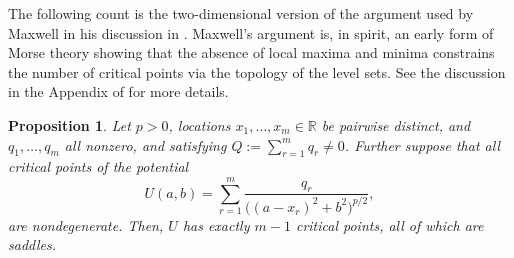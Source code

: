 \documentclass[leqno,11pt]{amsart}
\numberwithin{equation}{section}
\newtheorem{proposition}{Proposition}
\theoremstyle{definition}
\begin{document}
	The following count is the two-dimensional version of the argument used by Maxwell in his discussion in \cite[Chapter VI]{Maxwell}. Maxwell's argument is, in spirit, an early form of Morse theory showing that the absence of local maxima and minima constrains the number of critical points via the topology of the level sets. See the discussion in the Appendix of \cite{GNS} for more details.
	
	\begin{proposition}\label{prop:morse-count}
		Let $p>0$, locations $x_1 , \ldots , x_m \in \mathbb{R}$ be pairwise distinct, and $q_1, \ldots , q_m$ all nonzero, and satisfying $Q:=\sum_{r=1}^m q_r\neq0$. Further suppose that all critical points of the potential 
		\[
		U(a,b)=\sum_{r=1}^m \frac{ q_r}{\big((a-x_r)^2+b^2\big)^{p/2}},
		\]
		are nondegenerate. Then, $U$ has exactly $m-1$ critical points, all of which are saddles.
	\end{proposition}
	
\end{document}
